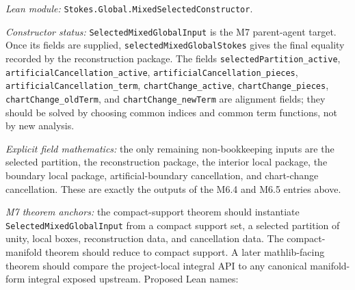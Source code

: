 \begin{theorem}
  \label{anc:m7_selected_mixed_global_assembly}
  \leanok
  \emph{Lean module:} \texttt{Stokes.Global.MixedSelectedConstructor}.

  \emph{Constructor status:}
  \texttt{SelectedMixedGlobalInput} is the M7 parent-agent target.  Once its
  fields are supplied, \texttt{selectedMixedGlobalStokes} gives the final
  equality recorded by the reconstruction package.  The fields
  \texttt{selectedPartition\_active},
  \texttt{artificialCancellation\_active},
  \texttt{artificialCancellation\_pieces},
  \texttt{artificialCancellation\_term},
  \texttt{chartChange\_active}, \texttt{chartChange\_pieces},
  \texttt{chartChange\_oldTerm}, and \texttt{chartChange\_newTerm} are
  alignment fields; they should be solved by choosing common indices and common
  term functions, not by new analysis.

  \emph{Explicit field mathematics:}
  the only remaining non-bookkeeping inputs are the selected partition, the
  reconstruction package, the interior local package, the boundary local
  package, artificial-boundary cancellation, and chart-change cancellation.
  These are exactly the outputs of the M6.4 and M6.5 entries above.

  \emph{M7 theorem anchors:}
  the compact-support theorem should instantiate
  \texttt{SelectedMixedGlobalInput} from a compact support set, a selected
  partition of unity, local boxes, reconstruction data, and cancellation data.
  The compact-manifold theorem should reduce to compact support.  A later
  mathlib-facing theorem should compare the project-local integral API to any
  canonical manifold-form integral exposed upstream.  Proposed Lean names:
\end{theorem}

